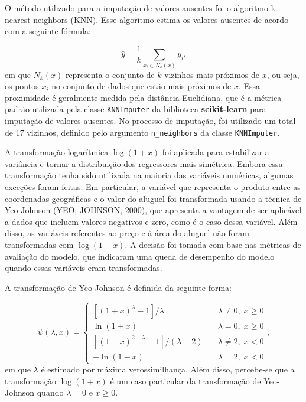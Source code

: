 \documentclass[
  12pt,
  a4paper,
]{scrreprt}
\begin{document}
\vspace{12pt}

O método utilizado para a imputação de valores ausentes foi o algoritmo
k-nearest neighbors (KNN). Esse algoritmo estima os valores ausentes de
acordo com a seguinte fórmula:

\[
\hat{y} = \frac{1}{k}\sum_{x_i \in N_k\left(x\right)}y_i\text{,}
\] em que \(N_k(x)\) representa o conjunto de \(k\) vizinhos mais
próximos de \(x\), ou seja, os pontos \(x_i\) no conjunto de dados que
estão mais próximos de \(x\). Essa proximidade é geralmente medida pela
distância Euclidiana, que é a métrica padrão utilizada pela classe
\texttt{KNNImputer} da biblioteca
\href{https://scikit-learn.org/stable/}{\textbf{scikit-learn}} para
imputação de valores ausentes. No processo de imputação, foi utilizado
um total de 17 vizinhos, definido pelo argumento \texttt{n\_neighbors}
da classe \texttt{KNNImputer}.

\vspace{12pt}

A transformação logarítmica \(\log\left(1 + x\right)\) foi aplicada para
estabilizar a variância e tornar a distribuição dos regressores mais
simétrica. Embora essa transformação tenha sido utilizada na maioria das
variáveis numéricas, algumas exceções foram feitas. Em particular, a
variável que representa o produto entre as coordenadas geográficas e o
valor do aluguel foi transformada usando a técnica de Yeo-Johnson (YEO;
JOHNSON, 2000), que apresenta a vantagem de ser aplicável a dados que
incluem valores negativos e zero, como é o caso dessa variável. Além
disso, as variáveis referentes ao preço e à área do aluguel não foram
transformadas com \(\log\left(1 + x\right)\). A decisão foi tomada com
base nas métricas de avaliação do modelo, que indicaram uma queda de
desempenho do modelo quando essas variáveis eram transformadas.

\vspace{12pt}

A transformação de Yeo-Johnson é definida da seguinte forma:

\[
\psi(\lambda, x) = \begin{cases}
    [(1 + x)^\lambda - 1] / \lambda  &  \lambda \neq 0, \; x \ge 0 \\
    \ln(1 + x)                       &  \lambda = 0, \; x \ge 0 \\
    [(1 - x)^{2 - \lambda} - 1] / (\lambda - 2) \quad & \lambda \neq 2, \; x < 0 \\
    -\ln(1 - x)                     &   \lambda = 2, \; x < 0
\end{cases} \text{,}
\] em que \(\lambda\) é estimado por máxima verossimilhança. Além disso,
percebe-se que a transformação \(\log(1 + x)\) é um caso particular da
transformação de Yeo-Johnson quando \(\lambda = 0\) e \(x \ge 0\).
\end{document}

